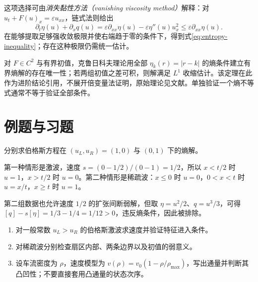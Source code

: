 这项选择可由\emph{消失黏性方法（vanishing viscosity method）}解释：对 $u_t+F(u)_x=\varepsilon u_{xx}$，链式法则给出
\[
 \partial_t\eta(u)+\partial_xq(u)
 =\varepsilon\partial_{xx}\eta(u)-\varepsilon\eta''(u)u_x^2
 \le\varepsilon\partial_{xx}\eta(u).
\]
在能够提取足够强收敛极限并使右端趋于零的条件下，得到式\eqref{eq:entropy-inequality}；存在这种极限仍需统一估计。

对 $F\in C^2$ 与有界初值，克鲁日科夫理论用全部 $\eta_k(r)=|r-k|$ 的熵条件建立有界熵解的存在唯一性；若两组初值之差可积，则解满足 $L^1$ 收缩估计。该定理在此作为进阶结论引用，不展开倍变量法证明，原始理论见文献\cite{kruzhkov}。单独验证一个熵不等式通常不等于验证全部条件。

\section{例题与习题}
\begin{example}
分别求伯格斯方程在 $(u_L,u_R)=(1,0)$ 与 $(0,1)$ 下的熵解。
\end{example}
\begin{solve}
第一种情形是激波，速度 $s=(0-1/2)/(0-1)=1/2$，所以 $x<t/2$ 时 $u=1$，$x>t/2$ 时 $u=0$。第二种情形是稀疏波：$x\le0$ 时 $u=0$，$0<x<t$ 时 $u=x/t$，$x\ge t$ 时 $u=1$。

第二组数据也允许速度 $1/2$ 的扩张间断弱解，但取 $\eta=u^2/2$、$q=u^3/3$，可得 $[q]-s[\eta]=1/3-1/4=1/12>0$，违反熵条件，因此被排除。
\end{solve}
\begin{enumerate}
 \item 对一般常数 $u_L>u_R$ 的伯格斯激波求速度并验证特征进入条件。
 \item 对稀疏波分别检查扇区内部、两条边界以及初值的弱意义。
 \item 设车流密度为 $\rho$，速度模型为 $v(\rho)=v_0(1-\rho/\rho_{\max})$，写出通量并判断其凸凹性；不要直接套用凸通量的状态次序。
\end{enumerate}

